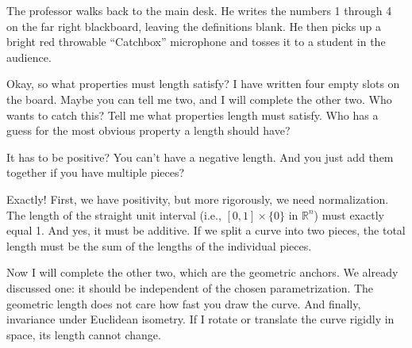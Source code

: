 \begin{nicebox}
The professor walks back to the main desk. He writes the numbers 1 through 4 on the far right blackboard, leaving the definitions blank. He then picks up a bright red throwable ``Catchbox'' microphone and tosses it to a student in the audience.
\end{nicebox}

\begin{spokenclean}[00:12:30 - 00:13:15]
Okay, so what properties must length satisfy? I have written four empty slots on the board. Maybe you can tell me two, and I will complete the other two. Who wants to catch this? Tell me what properties length must satisfy. Who has a guess for the most obvious property a length should have?
\end{spokenclean}

\begin{studentquestion}
It has to be positive? You can't have a negative length. And you just add them together if you have multiple pieces?
\end{studentquestion}

\begin{spokenclean}[00:13:15 - 00:14:15]
Exactly! First, we have positivity, but more rigorously, we need normalization. The length of the straight unit interval (i.e., $[0,1] \times \{0\}$ in $\mathbb{R}^n$) must exactly equal 1. And yes, it must be additive. If we split a curve into two pieces, the total length must be the sum of the lengths of the individual pieces. 
\end{spokenclean}

\begin{spokenclean}[00:14:15 - 00:15:00]
Now I will complete the other two, which are the geometric anchors. We already discussed one: it should be independent of the chosen parametrization. The geometric length does not care how fast you draw the curve. And finally, invariance under Euclidean isometry. If I rotate or translate the curve rigidly in space, its length cannot change.
\end{spokenclean}

